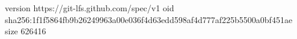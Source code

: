version https://git-lfs.github.com/spec/v1
oid sha256:1f1f5864fb9b26249963a00e036f4d63edd598af4d777af225b5500a0bf451ae
size 626416
